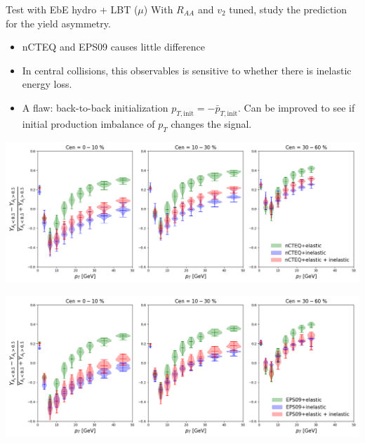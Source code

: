 \documentclass[11pt]{beamer}
\begin{document}
\begin{frame}{Test with EbE hydro + LBT ($\mu$)}
With $R_{AA}$ and $v_2$ tuned, study the prediction for the yield asymmetry.
\begin{itemize}
\item nCTEQ and EPS09 causes little difference
\item In central collisions, this observables is sensitive to whether there is inelastic energy loss.
\item A flaw: back-to-back initialization $p_{T, \textrm{init}} = -\bar{p}_{T, \textrm{init}}$. Can be improved to see if initial production imbalance of $p_T$ changes the signal.
\end{itemize}
\begin{overprint}
\begin{center}
\includegraphics[width=\textwidth]{fig/mu-tune/Yasym_nCTEQ.png}
\end{center}
\begin{center}
\includegraphics[width=\textwidth]{fig/mu-tune/Yasym_EPS09.png}
\end{center}
\end{overprint}
\end{frame}
\end{document}
